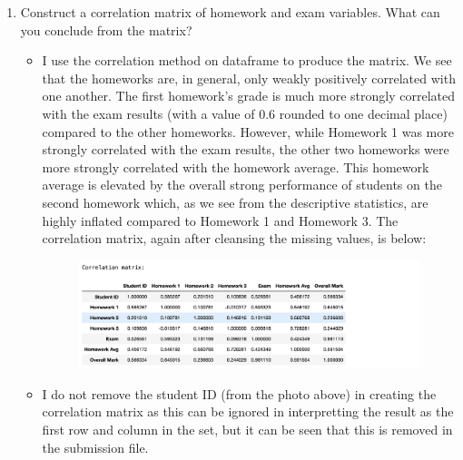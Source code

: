 \documentclass{scrreprt}
\begin{document}
\begin{enumerate}
\item  Construct a correlation matrix of homework and exam variables. What can you conclude from the matrix?
\begin{itemize}
	\item  I use the correlation method on dataframe to produce the matrix. We see that the homeworks are, in general, only weakly positively correlated with one another. The first homework's grade is much more strongly correlated with the exam results (with a value of 0.6 rounded to one decimal place) compared to the other homeworks. However, while Homework 1 was more strongly correlated with the exam results, the other two homeworks were more strongly correlated with the homework average. This homework average is elevated by the overall strong performance of students on the second homework which, as we see from the descriptive statistics, are highly inflated compared to Homework 1 and Homework 3. The correlation matrix, again after cleansing the missing values, is below:
	\begin{figure}[h]
		\includegraphics[width=12cm]{DM_Corr.png}
		\centering
	\end{figure}
\item I do not remove the student ID (from the photo above) in creating the correlation matrix as this can be ignored in interpretting the result as the first row and column in the set, but it can be seen that this is removed in the submission file.
\end{itemize}


\end{enumerate}
\end{document}
